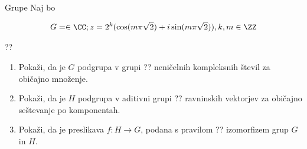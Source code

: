 \begin{frame}{Grupe}
	Naj bo 
	
	\begin{align}%
	 G &= \in \CC; z = 2^k (\cos(m\pi\sqrt{2}) + i \sin(m\pi\sqrt{2})),k,m \in \ZZ\\
	\end{align} 

	??
	\begin{enumerate}
		\item
			Pokaži, da je $G$ podgrupa v grupi ??
			neničelnih kompleksnih števil za običajno množenje.
		\item
			Pokaži, da je $H$ podgrupa v aditivni grupi ??
			ravninskih vektorjev za običajno seštevanje po komponentah.
		\item
			Pokaži, da je preslikava $f:H\to G$, podana s pravilom
			??
			izomorfizem grup $G$ in $H$.
	\end{enumerate}
\end{frame}
